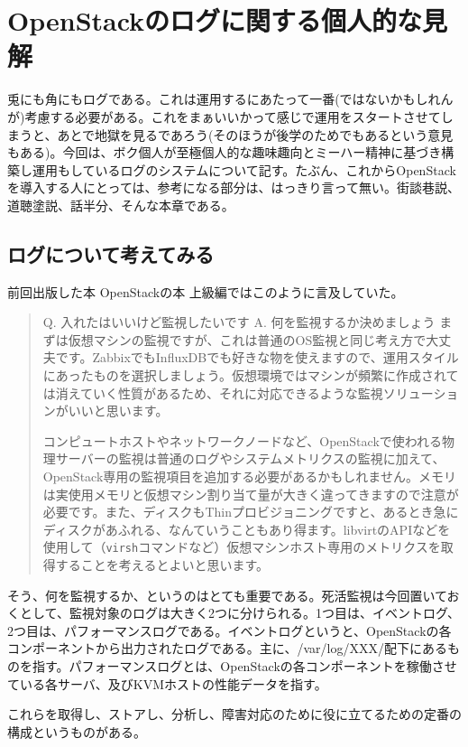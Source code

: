 \chapter{OpenStackのログに関する個人的な見解}

兎にも角にもログである。これは運用するにあたって一番(ではないかもしれんが)考慮する必要がある。これをまぁいいかって感じで運用をスタートさせてしまうと、あとで地獄を見るであろう(そのほうが後学のためでもあるという意見もある)。今回は、ボク個人が至極個人的な趣味趣向とミーハー精神に基づき構築し運用もしているログのシステムについて記す。たぶん、これからOpenStackを導入する人にとっては、参考になる部分は、はっきり言って無い。街談巷説、道聴塗説、話半分、そんな本章である。

\section{ログについて考えてみる}
前回出版した本 OpenStackの本 上級編ではこのように言及していた。

\begin{quotation}
	Q. 入れたはいいけど監視したいです
	A. 何を監視するか決めましょう
	まずは仮想マシンの監視ですが、これは普通のOS監視と同じ考え方で大丈夫です。ZabbixでもInfluxDBでも好きな物を使えますので、運用スタイルにあったものを選択しましょう。仮想環境ではマシンが頻繁に作成されては消えていく性質があるため、それに対応できるような監視ソリューションがいいと思います。

	コンピュートホストやネットワークノードなど、OpenStackで使われる物理サーバーの監視は普通のログやシステムメトリクスの監視に加えて、OpenStack専用の監視項目を追加する必要があるかもしれません。メモリは実使用メモリと仮想マシン割り当て量が大きく違ってきますので注意が必要です。また、ディスクもThinプロビジョニングですと、あるとき急にディスクがあふれる、なんていうこともあり得ます。libvirtのAPIなどを使用して（\verb|virsh|コマンドなど）仮想マシンホスト専用のメトリクスを取得することを考えるとよいと思います。
\end{quotation}

そう、何を監視するか、というのはとても重要である。死活監視は今回置いておくとして、監視対象のログは大きく2つに分けられる。1つ目は、イベントログ、2つ目は、パフォーマンスログである。イベントログというと、OpenStackの各コンポーネントから出力されたログである。主に、/var/log/XXX/配下にあるものを指す。パフォーマンスログとは、OpenStackの各コンポーネントを稼働させている各サーバ、及びKVMホストの性能データを指す。

これらを取得し、ストアし、分析し、障害対応のために役に立てるための定番の構成というものがある。

